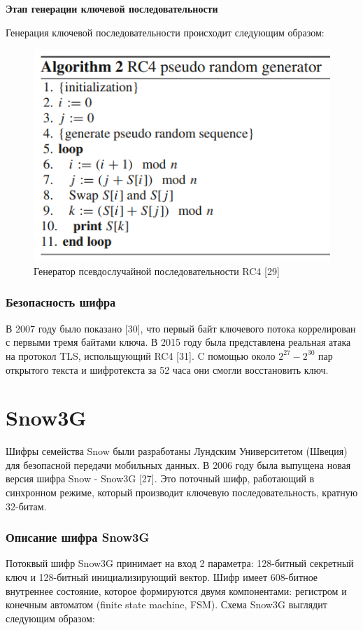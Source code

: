 \documentclass[colorthm]{./civarticle}
\begin{document}
\textbf{Этап генерации ключевой последовательности}

Генерация ключевой последовательности происходит следующим образом:

\begin{figure}[H]
    \centering
    \includegraphics[width=0.5\linewidth]{Снимок экрана 2024-01-12 163228.png}
    \caption{Генератор псевдослучайной последовательности RC4 [29]}
    \label{fig:enter-label}
\end{figure}

\subsubsection{Безопасность шифра}
В 2007 году было показано [30], что первый байт ключевого потока коррелирован с первыми тремя байтами ключа. В 2015 году была представлена реальная атака на протокол TLS, испольщующий RC4 [31]. C помощью около $2^{27}-2^{30}$ пар открытого текста и шифротекста за 52 часа они смогли восстановить ключ.

\section{Snow3G}

Шифры семейства Snow были разработаны Лундским Университетом (Швеция) для безопасной передачи мобильных данных. В 2006 году была выпущена новая версия шифра Snow - Snow3G [27]. Это поточный шифр, работающий в синхронном режиме, который производит ключевую последовательность, кратную 32-битам.

\subsubsection{Описание шифра Snow3G}

Потоквый шифр Snow3G принимает на вход 2 параметра: 128-битный секретный ключ и 128-битный инициализирующий вектор. Шифр имеет 608-битное внутреннее состояние, которое формируются двумя компонентами: регистром и конечным автоматом (finite state machine, FSM). Схема Snow3G выглядит следующим образом:
\end{document}
